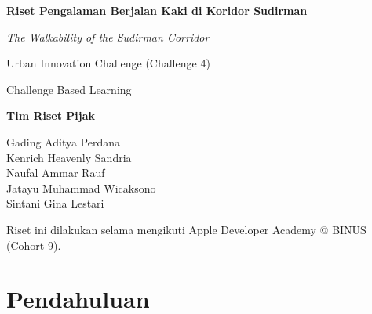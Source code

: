 \documentclass[11pt,a4paper]{report}
\newcommand{\teamname}{Tim Riset Pijak}
\begin{document}
\hypersetup{pageanchor=false}

\begin{titlepage}
\thispagestyle{empty}
\centering
\vspace*{1.5cm}
\vspace{1.2cm}

{\Large\bfseries Riset Pengalaman Berjalan Kaki di Koridor Sudirman\par}
\vspace{0.4em}
{\large\itshape The Walkability of the Sudirman Corridor\par}
\vspace{1.0cm}

{\large Urban Innovation Challenge (Challenge 4)\par}
{\normalsize Challenge Based Learning\par}
\vspace{2.0cm}

{\large\bfseries \teamname\par}
\vspace{0.8em}
{\normalsize
Gading Aditya Perdana \\
Kenrich Heavenly Sandria \\
Naufal Ammar Rauf \\
Jatayu Muhammad Wicaksono \\
Sintani Gina Lestari \par}
\vspace{1.2cm}


\vfill
{\footnotesize Riset ini dilakukan selama mengikuti Apple Developer Academy @ BINUS (Cohort 9).\par}
\end{titlepage}

\tableofcontents
\clearpage
{}
\hypersetup{pageanchor=true}

\chapter{Pendahuluan}            %
\end{document}
